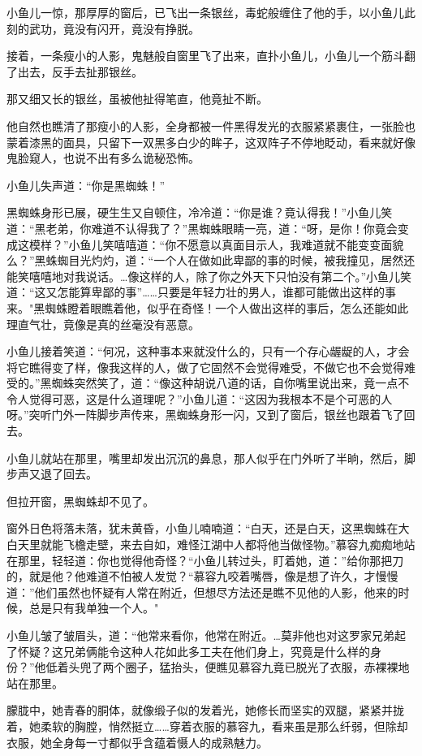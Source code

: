 \documentclass[12pt,oneside]{book}
\begin{document}
小鱼儿一惊，那厚厚的窗后，已飞出一条银丝，毒蛇般缠住了他的手，以小鱼儿此刻的武功，竟没有闪开，竟没有挣脱。

接着，一条瘦小的人影，鬼魅般自窗里飞了出来，直扑小鱼儿，小鱼儿一个筋斗翻了出去，反手去扯那银丝。

那又细又长的银丝，虽被他扯得笔直，他竟扯不断。

他自然也瞧清了那瘦小的人影，全身都被一件黑得发光的衣服紧紧裹住，一张脸也蒙着漆黑的面具，只留下一双黑多白少的眸子，这双阵子不停地眨动，看来就好像鬼脸窥人，也说不出有多么诡秘恐怖。

小鱼儿失声道：``你是黑蜘蛛！''

黑蜘蛛身形已展，硬生生又自顿住，冷冷道：``你是谁？竟认得我！''小鱼儿笑道：``黑老弟，你难道不认得我了？''黑蜘蛛眼睛一亮，道：``呀，是你！你竟会变成这模样？''小鱼儿笑嘻嘻道：``你不愿意以真面目示人，我难道就不能变变面貌么？''黑蛛蜘目光灼灼，道：``一个人在做如此卑鄙的事的时候，被我撞见，居然还能笑嘻嘻地对我说话。\ldots 像这样的人，除了你之外天下只怕没有第二个。''小鱼儿笑道：``这又怎能算卑鄙的事''\ldots\ldots 只要是年轻力壮的男人，谁都可能做出这样的事来。"黑蜘蛛瞪着眼瞧着他，似乎在奇怪！一个人做出这样的事后，怎么还能如此理直气壮，竟像是真的丝毫没有恶意。

小鱼儿接着笑道：``何况，这种事本来就没什么的，只有一个存心龌龊的人，才会将它瞧得变了样，像我这样的人，做了它固然不会觉得难受，不做它也不会觉得难受的。''黑蜘蛛突然笑了，道：``像这种胡说八道的话，自你嘴里说出来，竟一点不令人觉得可恶，这是什么道理呢？''小鱼儿道：``这因为我根本不是个可恶的人呀。''突听门外一阵脚步声传来，黑蜘蛛身形一闪，又到了窗后，银丝也跟着飞了回去。

小鱼儿就站在那里，嘴里却发出沉沉的鼻息，那人似乎在门外听了半晌，然后，脚步声又退了回去。

但拉开窗，黑蜘蛛却不见了。

窗外日色将落未落，犹未黄昏，小鱼儿喃喃道：``白天，还是白天，这黑蜘蛛在大白天里就能飞檐走壁，来去自如，难怪江湖中人都将他当做怪物。''慕容九痴痴地站在那里，轻轻道：你也觉得他奇怪？``小鱼儿转过头，盯着她，道：''给你那把刀的，就是他？他难道不怕被人发觉？``慕容九咬着嘴唇，像是想了许久，才慢慢道：''他们虽然也怀疑有人常在附近，但想尽方法还是瞧不见他的人影，他来的时候，总是只有我单独一个人。"

小鱼儿皱了皱眉头，道：``他常来看你，他常在附近。\ldots 莫非他也对这罗家兄弟起了怀疑？这兄弟俩能令这种人花如此多工夫在他们身上，究竟是什么样的身份？''他低着头兜了两个圈子，猛抬头，便瞧见慕容九竟已脱光了衣服，赤裸裸地站在那里。

朦胧中，她青春的胴体，就像缎子似的发着光，她修长而坚实的双腿，紧紧并拢着，她柔软的胸膛，悄然挺立\ldots\ldots 穿着衣服的慕容九，看来虽是那么纤弱，但除却衣服，她全身每一寸都似乎含蕴着慑人的成熟魅力。
\end{document}
